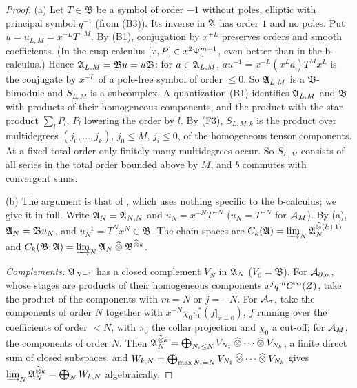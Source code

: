 \begin{proof}
(a) Let \(T\in\mathfrak B\) be a symbol of order \(-1\) without poles,
elliptic with principal symbol \(q^{-1}\) (from (B3)). Its inverse in
\(\mathfrak A\) has order \(1\) and no poles. Put \(u=u_{L,M}=x^{-L}T^{-M}\). By
(B1), conjugation by \(x^{\pm L}\) preserves orders and smooth
coefficients. (In the cusp calculus \([x,P]\in x^2\Psi_{c}^{m-1}\), even
better than in the b-calculus.) Hence \(\mathfrak A_{L,M}=\mathfrak Bu=u\mathfrak
B\): for \(a\in\mathfrak A_{L,M}\), \(au^{-1}=x^{-L}(x^La)T^Mx^L\) is the conjugate
by \(x^{-L}\) of a pole-free symbol of order \(\le0\). So \(\mathfrak A_{L,M}\) is
a \(\mathfrak B\)-bimodule and \(S_{L,M}\) is a subcomplex. A quantization
(B1) identifies \(\mathfrak A_{L,M}\) and \(\mathfrak B\) with products of their
homogeneous components, and the product with the star product
\(\sum_lP_l\), \(P_l\) lowering the order by \(l\). By (F3), \(S_{L,M,k}\)
is the product over multidegrees \((j_0,\dots,j_k)\), \(j_0\le M\),
\(j_i\le0\), of the homogeneous tensor components. At a fixed total order
only finitely many multidegrees occur. So \(S_{L,M}\) consists of all
series in the total order bounded above by \(M\), and \(b\) commutes with
convergent sums.

(b) The argument is that of \cite{HHb}, which uses nothing specific to
the b-calculus; we give it in full. Write \(\mathfrak A_N=\mathfrak A_{N,N}\) and
\(u_N=x^{-N}T^{-N}\) (\(u_N=T^{-N}\) for \(\mathcal A_M\)). By (a),
\(\mathfrak A_N=\mathfrak Bu_N\), and \(u_N^{-1}=T^Nx^N\in\mathfrak B\). The
chain spaces are \(C_k(\mathfrak A)=\varinjlim_N\mathfrak A_N^{\mathbin{\widehat\otimes}(k+1)}\) and
\(C_k(\mathfrak B,\mathfrak A)=\varinjlim_N\mathfrak A_N\mathbin{\widehat\otimes}\mathfrak B^{\mathbin{\widehat\otimes} k}\).

\emph{Complements.} \(\mathfrak A_{N-1}\) has a closed complement \(V_N\) in
\(\mathfrak A_N\) (\(V_0=\mathfrak B\)). For \(\mathcal A_{\partial,\sigma}\), whose stages are products
of their homogeneous components \(x^jq^mC^\infty(Z)\), take the product of
the components with \(m=N\) or \(j=-N\). For \(\mathcal A_\sigma\), take the
components of order \(N\) together with
\(x^{-N}\chi_0\pi_0^*(f|_{x=0})\), \(f\) running over the coefficients of
order \(<N\), with \(\pi_0\) the collar projection and \(\chi_0\) a
cut-off; for \(\mathcal A_M\), the components of order \(N\). Then
\(\mathfrak A_N^{\mathbin{\widehat\otimes} k}=\bigoplus_{N_i\le N}V_{N_1}\mathbin{\widehat\otimes}\cdots\mathbin{\widehat\otimes} V_{N_k}\), a
finite direct sum of closed subspaces, and \(W_{k,N}=\bigoplus_{\max
N_i=N}V_{N_1}\mathbin{\widehat\otimes}\cdots\mathbin{\widehat\otimes} V_{N_k}\) gives
\(\varinjlim_N\mathfrak A_N^{\mathbin{\widehat\otimes} k}=\bigoplus_NW_{k,N}\) algebraically.


\end{proof}
